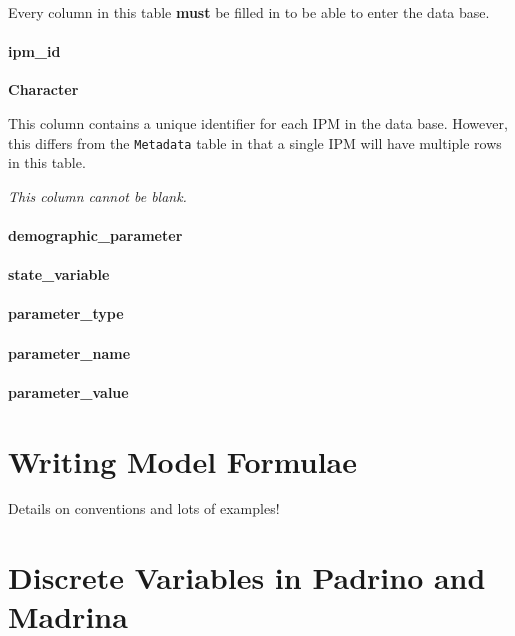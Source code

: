 \documentclass[]{article}
\let\oldparagraph\paragraph
\renewcommand{\paragraph}[1]{\oldparagraph{#1}\mbox{}}
\begin{document}
Every column in this table \textbf{must} be filled in to be able to
enter the data base.

\paragraph{ipm\_id}\label{ipm_id-4}

\textbf{Character}

This column contains a unique identifier for each IPM in the data base.
However, this differs from the \texttt{Metadata} table in that a single
IPM will have multiple rows in this table.

\emph{This column cannot be blank.}

\paragraph{demographic\_parameter}\label{demographic_parameter-1}

\paragraph{state\_variable}\label{state_variable-2}

\paragraph{parameter\_type}\label{parameter_type}

\paragraph{parameter\_name}\label{parameter_name}

\paragraph{parameter\_value}\label{parameter_value}

\hypertarget{model-forms}{\section{Writing Model
Formulae}\label{model-forms}}

Details on conventions and lots of examples!

\hypertarget{discrete-vars}{\section{Discrete Variables in Padrino and
Madrina}\label{discrete-vars}}
\end{document}
